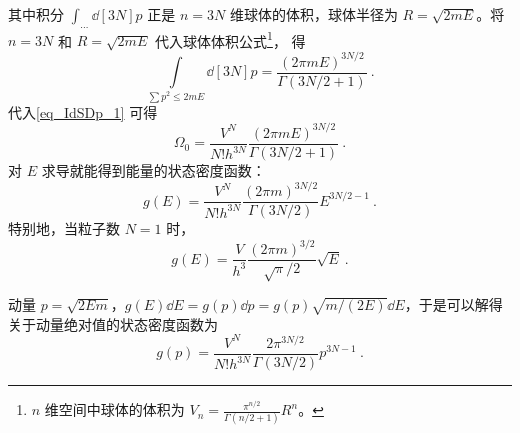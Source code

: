 其中积分 $\int_{\dots} \dd[3N]{p} $ 正是 $n=3N$ 维球体的体积，球体半径为 $R = \sqrt{2mE}$。将 $n=3N$ 和 $R = \sqrt{2mE} $ 代入球体体积公式\footnote{$n$ 维空间中球体的体积为
$V_n = \frac{\pi^{n/2}}{\Gamma(n/2+1)}R^n$。}， 得
\begin{equation}
\int\limits_{\sum p^2 \leqslant 2mE} \dd[3N]{p} = \frac{(2\pi mE)^{3N/2}}{\Gamma(3N/2+1)}~.
\end{equation}
代入\autoref{eq_IdSDp_1} 可得
\begin{equation}\label{eq_IdSDp_2}
\Omega_0 = \frac{V^N}{N! h^{3N}} \frac{(2\pi mE)^{3N/2}}{\Gamma(3N/2+1)}~.
\end{equation}
对 $E$ 求导就能得到能量的状态密度函数：
\begin{equation}\label{eq_IdSDp_3}
g(E) = \frac{V^N}{N! h^{3N}} \frac{(2\pi m)^{3N/2}}{\Gamma(3N/2)} E^{3N/2 - 1}~.
\end{equation}
特别地，当粒子数 $N=1$ 时，
\begin{equation}
g(E)=\frac{V}{h^3} \frac{(2\pi m)^{3/2} }{\sqrt{\pi}/2} \sqrt{E}~.
\end{equation}

动量 $p=\sqrt{2Em}$，$g(E)\dd E=g(p)\dd p=g(p)\sqrt{m/(2E)}\dd E$，于是可以解得关于动量绝对值的状态密度函数为
\begin{equation}\label{eq_IdSDp_4}
g(p) = \frac{V^N}{N! h^{3N}} \frac{2\pi^{3N/2}}{\Gamma(3N/2)} p^{3N - 1}~.
\end{equation}